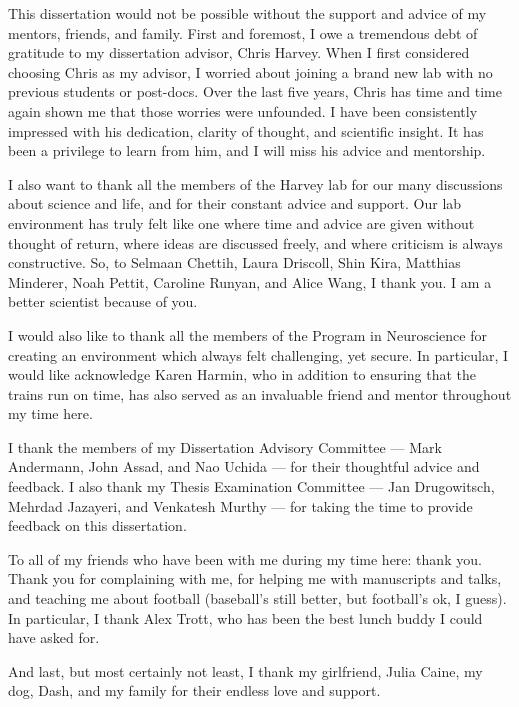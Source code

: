 
This dissertation would not be possible without the support and advice of my mentors, friends, and family. First and foremost, I owe a tremendous debt of gratitude to my dissertation advisor, Chris Harvey. When I first considered choosing Chris as my advisor, I worried about joining a brand new lab with no previous students or post-docs. Over the last five years, Chris has time and time again shown me that those worries were unfounded. I have been consistently impressed with his dedication, clarity of thought, and scientific insight. It has been a privilege to learn from him, and I will miss his advice and mentorship.

\bigskip
I also want to thank all the members of the Harvey lab for our many discussions about science and life, and for their constant advice and support. Our lab environment has truly felt like one where time and advice are given without thought of return, where ideas are discussed freely, and where criticism is always constructive. So, to Selmaan Chettih, Laura Driscoll, Shin Kira, Matthias Minderer, Noah Pettit, Caroline Runyan, and Alice Wang, I thank you. I am a better scientist because of you.

\bigskip
I would also like to thank all the members of the Program in Neuroscience for creating an environment which always felt challenging, yet secure. In particular, I would like acknowledge Karen Harmin, who in addition to ensuring that the trains run on time, has also served as an invaluable friend and mentor throughout my time here. 

\bigskip
I thank the members of my Dissertation Advisory Committee --- Mark Andermann, John Assad, and Nao Uchida --- for their thoughtful advice and feedback. I also thank my Thesis Examination Committee --- Jan Drugowitsch, Mehrdad Jazayeri, and Venkatesh Murthy --- for taking the time to provide feedback on this dissertation. 

\bigskip
To all of my friends who have been with me during my time here: thank you. Thank you for complaining with me, for helping me with manuscripts and talks, and teaching me about football (baseball's still better, but football's ok, I guess). In particular, I thank Alex Trott, who has been the best lunch buddy I could have asked for. 

\bigskip
And last, but most certainly not least, I thank my girlfriend, Julia Caine, my dog, Dash, and my family for their endless love and support.  